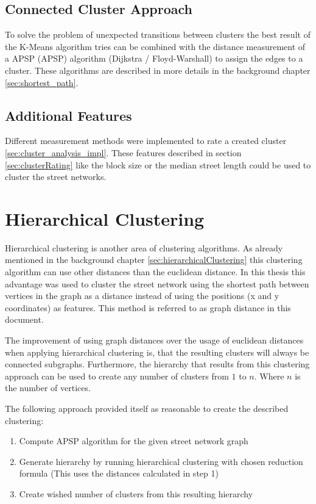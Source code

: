 \subsection{Connected Cluster Approach} \label{sec:connected_cluster_approach}
To solve the problem of unexpected transitions between clusters the best result of the K-Means algorithm tries can be combined with the distance measurement of a \acrlong{APSP} (\acrshort{APSP}) algorithm (Dijkstra / Floyd-Warshall) to assign the edges to a cluster. These algorithms are described in more details in the background chapter \ref{sec:shortest_path}.

\subsection{Additional Features}
Different measurement methods were implemented to rate a created cluster \ref{sec:cluster_analysis_impl}. These features described in section \ref{sec:clusterRating} like the block size or the median street length could be used to cluster the street networks.

\pagebreak
\section{Hierarchical Clustering}
Hierarchical clustering is another area of clustering algorithms. As already mentioned in the background chapter \ref{sec:hierarchicalClustering} this clustering algorithm can use other distances than the euclidean distance. In this thesis this advantage was used to cluster the street network using the shortest path between vertices in the graph as a distance instead of using the positions (x and y coordinates) as features. This method is referred to as graph distance in this document.

The improvement of using graph distances over the usage of euclidean distances when applying hierarchical clustering is, that the resulting clusters will always be connected subgraphs. Furthermore, the hierarchy that results from this clustering approach can be used to create any number of clusters from $1$ to $n$. Where $n$ is the number of vertices.

The following approach provided itself as reasonable to create the described clustering:

\begin{enumerate}
    \item Compute \acrshort{APSP} algorithm for the given street network graph
    \item Generate hierarchy by running hierarchical clustering with chosen reduction formula (This uses the distances calculated in step 1)
    \item Create wished number of clusters from this resulting hierarchy
\end{enumerate}

